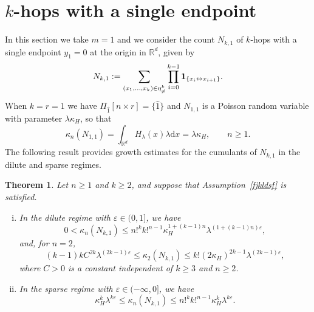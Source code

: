 \documentclass[12pt]{article}
\newcommand{\R}{\mathbb{R}}
\newcommand{\bone}{{\bf 1}}
\newtheorem{thm}[prop]{Theorem}
\def\real{{\mathord{\mathbb R}}}
\numberwithin{equation}{section}
\begin{document}
\section{$k$-hops with a single endpoint}
\noindent 
In this section we take $m=1$ and
we consider the count $N_{k,1}$ of $k$-hops with a single endpoint $y_1 = 0$ at the origin in $\real^d$, given by 
\begin{equation}
\nonumber
  N_{k,1}:=\sum_{(x_1, \ldots , x_k)\in\eta_{\ne}^k}\prod_{i=0}^{k-1}\bone_{\{x_i\leftrightarrow x_{i+1}\}}.
\end{equation}
When $k=r=1$ we have $\Pi_{\widehat{1}}[n\times r]=\{\widehat{1}\}$ and 
 $N_{1,1}$ is a Poisson random variable with parameter
 $\lambda \kappa_H$, so that 
\begin{equation}
\nonumber
\kappa_n(N_{1,1})=\int_{\R^d}H_\lambda(x)\lambda\mathrm{d}x=\lambda \kappa_H,
\qquad n \geq 1.
\end{equation}
The following result provides
growth estimates for the cumulants of $N_{k,1}$ in the dilute and sparse regimes.
\begin{thm}\label{khopone}
  Let $n\geq 1$ and $k\geq 2$,
  and suppose that Assumption~\ref{fjkldsf} is satisfied. 
\begin{enumerate}[i)]
\item In the dilute regime with $\varepsilon \in (0,1]$, we have
  \begin{equation}
    \label{onefixed-1}
    0<\kappa_n(N_{k,1})\leq
    n!^k k!^{n-1}
    \kappa_H^{1+(k-1)n} \lambda^{(1+(k-1)n)\varepsilon}
    ,
\end{equation}
and, for $n=2$, 
\begin{equation}
  \label{onefixed-2}
  (k-1)k
  C^{2k}
  \lambda^{(2k-1)\varepsilon} 
  \leq \kappa_2(N_{k,1})
 \leq 
  k!
  (2\kappa_H)^{2k-1}
  \lambda^{(2k-1)\varepsilon} 
  ,
\end{equation}
 where $C>0$ is a constant independent of $k\geq 3$ and $n \geq 2$.
\item In the sparse regime with $\varepsilon \in (-\infty , 0]$, we have 
\begin{equation}
\label{fjkldsf-1} 
\kappa_H^k \lambda^{k\varepsilon}
\leq \kappa_n(N_{k,1})\leq
n!^k k!^{n-1}
  \kappa_H^k \lambda^{k\varepsilon}. 
\end{equation}
\end{enumerate}
\end{thm}
\end{document}
